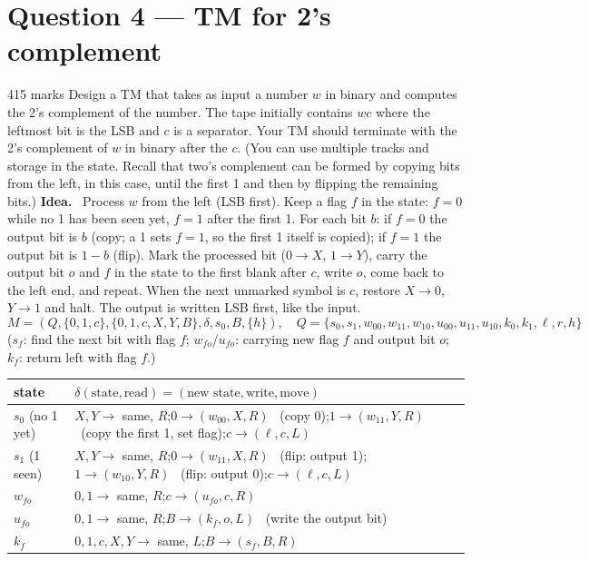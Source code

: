 \documentclass[10.5pt,a4paper]{article}
\newcommand{\ansh}[1]{\textbf{\color{exborder}#1}\ }
\begin{document}
\section{Question 4 --- TM for 2's complement}
\begin{qa}{4}{15 marks}
Design a TM that takes as input a number $w$ in binary and computes the 2's complement of the number. The tape initially contains $wc$ where the
leftmost bit is the LSB and $c$ is a separator. Your TM should terminate with the 2's complement of $w$ in binary after the $c$. (You can use multiple
tracks and storage in the state. Recall that two's complement can be formed by copying bits from the left, in this case, until the first 1 and then
by flipping the remaining bits.)
\tcblower
\ansh{Idea.} Process $w$ from the left (LSB first). Keep a flag $f$ in the state: $f=0$ while no 1 has been seen yet, $f=1$ after the first 1.
For each bit $b$: if $f=0$ the output bit is $b$ (copy; a 1 sets $f=1$, so the first 1 itself is copied); if $f=1$ the output bit is $1-b$ (flip).
Mark the processed bit ($0\to X$, $1\to Y$), carry the output bit $o$ and $f$ in the state to the first blank after $c$, write $o$, come back to the
left end, and repeat. When the next unmarked symbol is $c$, restore $X\to0$, $Y\to1$ and halt. The output is written LSB first, like the input.
\[M=(Q,\{0,1,c\},\{0,1,c,X,Y,B\},\delta,s_0,B,\{h\}),\quad Q=\{s_0,s_1,w_{00},w_{11},w_{10},u_{00},u_{11},u_{10},k_0,k_1,\ell,r,h\}\]
($s_f$: find the next bit with flag $f$; $w_{fo}$/$u_{fo}$: carrying new flag $f$ and output bit $o$; $k_f$: return left with flag $f$.)
\begin{center}\small
\begin{tabular}{@{}l|>{\raggedright\arraybackslash}p{13.2cm}@{}}
\toprule
state & $\delta(\text{state},\text{read})=(\text{new state},\text{write},\text{move})$\\\midrule
$s_0$ (no 1 yet) & $X,Y\to$ same, $R$;\quad $0\to(w_{00},X,R)$ \ (copy 0);\quad $1\to(w_{11},Y,R)$ \ (copy the first 1, set flag);\quad $c\to(\ell,c,L)$\\
$s_1$ (1 seen) & $X,Y\to$ same, $R$;\quad $0\to(w_{11},X,R)$ \ (flip: output 1);\quad $1\to(w_{10},Y,R)$ \ (flip: output 0);\quad $c\to(\ell,c,L)$\\
$w_{fo}$ & $0,1\to$ same, $R$;\quad $c\to(u_{fo},c,R)$\\
$u_{fo}$ & $0,1\to$ same, $R$;\quad $B\to(k_f,o,L)$ \ (write the output bit)\\
$k_f$ & $0,1,c,X,Y\to$ same, $L$;\quad $B\to(s_f,B,R)$\\

\end{tabular}
\end{center}
\end{qa}
\end{document}
